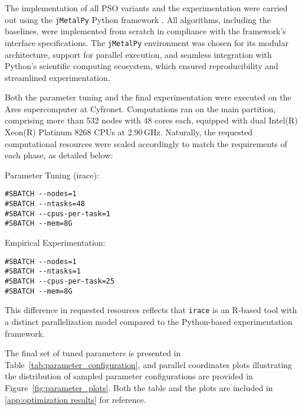 {The implementation of all PSO variants and the experimentation were carried out using the \texttt{jMetalPy} Python framework \citep{benitezhidalgo2019jmetalpy}. All algorithms, including the baselines, were implemented from scratch in compliance with the framework’s interface specifications. The \texttt{jMetalPy} environment was chosen for its modular architecture, support for parallel execution, and seamless integration with Python’s scientific computing ecosystem, which ensured reproducibility and streamlined experimentation.

Both the parameter tuning and the final experimentation were executed on the Ares supercomputer at Cyfronet. Computations ran on the main partition, comprising more than 532 nodes with 48 cores each, equipped with dual Intel(R) Xeon(R) Platinum 8268 CPUs at 2.90\,GHz. Naturally, the requested computational resources were scaled accordingly to match the requirements of each phase, as detailed below:

\vspace{.835em}
\begin{tcbraster}[
    raster columns=2, 
    raster equal height, 
    nobeforeafter, 
    raster column skip=2cm
]
\begin{blkblock}{Parameter Tuning (irace):}
    \begin{verbatim}#SBATCH --nodes=1
#SBATCH --ntasks=48
#SBATCH --cpus-per-task=1
#SBATCH --mem=8G\end{verbatim}
\end{blkblock}
\begin{blkblock}{Empirical Experimentation:}
    \begin{verbatim}#SBATCH --nodes=1
#SBATCH --ntasks=1
#SBATCH --cpus-per-task=25
#SBATCH --mem=8G\end{verbatim}
\end{blkblock}
\end{tcbraster}
\vspace{.835em}

\noindent This difference in requested resources reflects that \texttt{irace} is an R-based tool with a distinct parallelization model compared to the Python-based experimentation framework.

The final set of tuned parameters is presented in Table~\ref{tab:parameter_configuration}, and parallel coordinates plots illustrating the distribution of sampled parameter configurations are provided in Figure~\ref{fig:parameter_plots}. Both the table and the plots are included in \autoref{app:optimization results} for reference.

}
